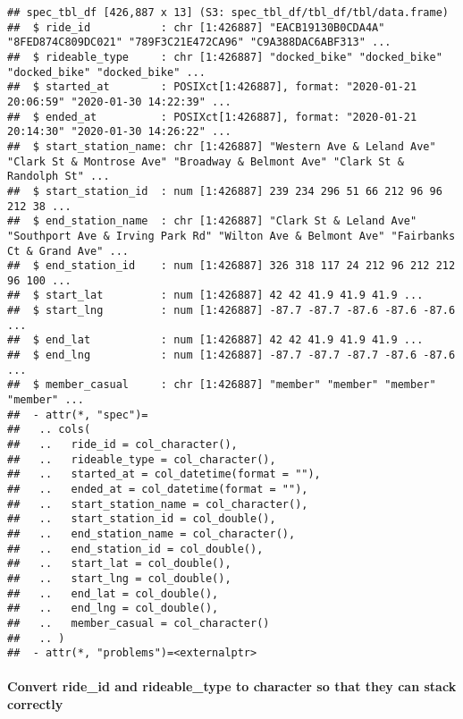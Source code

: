 \documentclass[
]{article}
\begin{document}
\begin{verbatim}
## spec_tbl_df [426,887 x 13] (S3: spec_tbl_df/tbl_df/tbl/data.frame)
##  $ ride_id           : chr [1:426887] "EACB19130B0CDA4A" "8FED874C809DC021" "789F3C21E472CA96" "C9A388DAC6ABF313" ...
##  $ rideable_type     : chr [1:426887] "docked_bike" "docked_bike" "docked_bike" "docked_bike" ...
##  $ started_at        : POSIXct[1:426887], format: "2020-01-21 20:06:59" "2020-01-30 14:22:39" ...
##  $ ended_at          : POSIXct[1:426887], format: "2020-01-21 20:14:30" "2020-01-30 14:26:22" ...
##  $ start_station_name: chr [1:426887] "Western Ave & Leland Ave" "Clark St & Montrose Ave" "Broadway & Belmont Ave" "Clark St & Randolph St" ...
##  $ start_station_id  : num [1:426887] 239 234 296 51 66 212 96 96 212 38 ...
##  $ end_station_name  : chr [1:426887] "Clark St & Leland Ave" "Southport Ave & Irving Park Rd" "Wilton Ave & Belmont Ave" "Fairbanks Ct & Grand Ave" ...
##  $ end_station_id    : num [1:426887] 326 318 117 24 212 96 212 212 96 100 ...
##  $ start_lat         : num [1:426887] 42 42 41.9 41.9 41.9 ...
##  $ start_lng         : num [1:426887] -87.7 -87.7 -87.6 -87.6 -87.6 ...
##  $ end_lat           : num [1:426887] 42 42 41.9 41.9 41.9 ...
##  $ end_lng           : num [1:426887] -87.7 -87.7 -87.7 -87.6 -87.6 ...
##  $ member_casual     : chr [1:426887] "member" "member" "member" "member" ...
##  - attr(*, "spec")=
##   .. cols(
##   ..   ride_id = col_character(),
##   ..   rideable_type = col_character(),
##   ..   started_at = col_datetime(format = ""),
##   ..   ended_at = col_datetime(format = ""),
##   ..   start_station_name = col_character(),
##   ..   start_station_id = col_double(),
##   ..   end_station_name = col_character(),
##   ..   end_station_id = col_double(),
##   ..   start_lat = col_double(),
##   ..   start_lng = col_double(),
##   ..   end_lat = col_double(),
##   ..   end_lng = col_double(),
##   ..   member_casual = col_character()
##   .. )
##  - attr(*, "problems")=<externalptr>
\end{verbatim}

\hypertarget{convert-ride_id-and-rideable_type-to-character-so-that-they-can-stack-correctly}{%
\paragraph{Convert ride\_id and rideable\_type to character so that they
can stack
correctly}\label{convert-ride_id-and-rideable_type-to-character-so-that-they-can-stack-correctly}}
\end{document}
